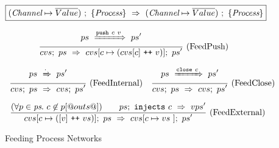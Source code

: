 
\begin{figure}

\newcommand\vs {\ti{vs}}
\newcommand\accs {\ti{accs}}
\newcommand\network {\ti{ps}}

$$
  \boxed{
    (\textit{Channel} \mapsto \overline{Value})~;~\{ \textit{Process} \}~\Rightarrow~(\textit{Channel} \mapsto \overline{Value})~;~\{ \textit{Process} \}
  }
$$







$$
\enskip \frac {\displaystyle 
  ps~\xRightarrow{\texttt{push}~c~v}~ps'
} {\displaystyle 
  cvs;~ps~\Rightarrow~cvs[c \mapsto (cvs[c] ~\texttt{++}~ v)];~ps'
} \  \mbox{(FeedPush)} \enskip
$$

$$
\enskip \frac {\displaystyle 
  ps~\xRightarrow{\cdot}~ps'
} {\displaystyle 
  cvs;~ps~\Rightarrow~cvs;~ps'
} \  \mbox{(FeedInternal)} \enskip
\enskip \frac {\displaystyle 
  ps~\xRightarrow{\texttt{close}~c}~ps'
} {\displaystyle 
  cvs;~ps~\Rightarrow~cvs;~ps'
} \  \mbox{(FeedClose)} \enskip
$$






$$
\ruleIN{
  (\forall p \in \network.~c \not\in p[@outs@])
\qquad
  \ProcsInject
    {ps}
    {c}
    {v}
    {ps'}
}{
  \ProcsFeed
    {cvs[c \mapsto ([v] \listappend vs)]}
    {ps}
    {cvs[c \mapsto vs~]}
    {ps'}
}{FeedExternal}
$$



\caption{Feeding Process Networks}
\label{fig:Process:Eval:Feed}
\end{figure}

